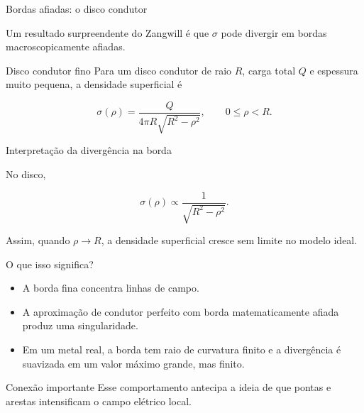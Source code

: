\documentclass[aspectratio=169]{beamer}
\begin{document}
\begin{frame}{Bordas afiadas: o disco condutor}

\small

Um resultado surpreendente do Zangwill é que \(\sigma\) pode divergir em bordas
macroscopicamente afiadas.

\begin{mybox}{Disco condutor fino}
Para um disco condutor de raio \(R\), carga total \(Q\) e espessura muito pequena,
a densidade superficial é
\end{mybox}

\begin{eqbox}
\begin{equation}
\sigma(\rho)
=
\frac{Q}
{4\pi R\sqrt{R^2-\rho^2}},
\qquad
0\le \rho<R.
\tag{5.18}
\label{eq:sigma-disco-condutor}
\end{equation}
\end{eqbox}

\begin{center}
\end{center}

\end{frame}

\begin{frame}{Interpretação da divergência na borda}

\small

No disco,

\[
\sigma(\rho)\propto \frac{1}{\sqrt{R^2-\rho^2}}.
\]

Assim, quando \(\rho\to R\), a densidade superficial cresce sem limite no modelo
ideal.

\begin{mybox}{O que isso significa?}
\begin{itemize}
\item A borda fina concentra linhas de campo.
\item A aproximação de condutor perfeito com borda matematicamente afiada
produz uma singularidade.
\item Em um metal real, a borda tem raio de curvatura finito e a divergência é
suavizada em um valor máximo grande, mas finito.
\end{itemize}
\end{mybox}

\begin{alertblock}{Conexão importante}
Esse comportamento antecipa a ideia de que pontas e arestas intensificam o
campo elétrico local.
\end{alertblock}

\end{frame}
\end{document}
